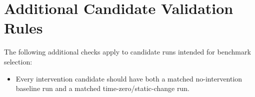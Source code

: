 \documentclass[11pt]{article}
\begin{document}
\section*{Additional Candidate Validation Rules}

The following additional checks apply to candidate runs intended for benchmark selection:

\begin{itemize}
 \item Every intervention candidate should have both a matched no-intervention baseline run and a matched time-zero/static-change run.
\end{itemize}
\end{document}
